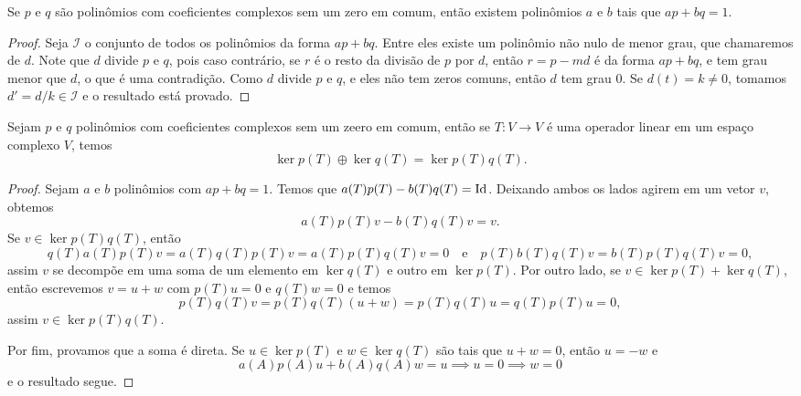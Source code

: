 \begin{lemma}
    Se $p$ e $q$ são polinômios com coeficientes complexos sem um zero em comum, então existem polinômios $a$ e $b$ tais que $ap + bq = 1$.
\end{lemma}
\begin{proof}
    Seja $\mathcal{I}$ o conjunto de todos os polinômios da forma $ap + bq$. Entre eles existe um polinômio não nulo de menor grau, que chamaremos de $d$. Note que $d$ divide $p$ e $q$, pois caso contrário, se $r$ é o resto da divisão de $p$ por $d$, então $r = p - md$ é da forma $ap + bq$, e tem grau menor que $d$, o que é uma contradição. Como $d$ divide $p$ e $q$, e eles não tem zeros comuns, então $d$ tem grau $0$. Se $d(t) = k \neq 0$, tomamos $d' = d/k \in \mathcal{I}$ e o resultado está provado.
\end{proof}

\begin{lemma}
    Sejam $p$ e $q$ polinômios com coeficientes complexos sem um zeero em comum, então se $T \colon V \to V$ é uma operador linear em um espaço complexo $V$, temos \begin{equation}
        \ker p(T) \oplus \ker q(T) = \ker p(T)q(T).
    \end{equation}
\end{lemma}
\begin{proof}
    Sejam $a$ e $b$ polinômios com $ap + bq = 1$. Temos que $a(T)p(T) - b(T)q(T) = \operatorname{Id}$. Deixando ambos os lados agirem em um vetor $v$, obtemos \begin{equation}
        a(T)p(T)v - b(T)q(T)v = v.
    \end{equation} Se $v \in \ker p(T)q(T)$, então \begin{equation}
        q(T)a(T)p(T)v = a(T)q(T)p(T)v = a(T)p(T)q(T)v = 0 \quad \text{e} \quad p(T)b(T)q(T)v = b(T)p(T)q(T)v = 0,
    \end{equation} assim $v$ se decompõe em uma soma de um elemento em $\ker q(T)$ e outro em $\ker p(T)$. Por outro lado, se $v \in \ker p(T) + \ker q(T)$, então escrevemos $v = u + w$ com $p(T)u = 0$ e $q(T)w = 0$ e temos \begin{equation}
        p(T)q(T)v = p(T)q(T)(u + w) = p(T)q(T)u = q(T)p(T)u = 0,
    \end{equation} assim $v \in \ker p(T)q(T)$.

    Por fim, provamos que a soma é direta. Se $u \in \ker p(T)$ e $w \in \ker q(T)$ são tais que $u + w = 0$, então $u = -w$ e \begin{equation}
        a(A)p(A)u + b(A)q(A)w = u \implies u = 0 \implies w = 0
    \end{equation} e o resultado segue.
\end{proof}

